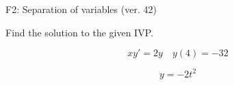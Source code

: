 \begin{exercise}
  \begin{exerciseTitle}F2: Separation of variables (ver. 42)\end{exerciseTitle}
  \begin{exerciseStatement}
    
Find the solution to the given IVP.

    
\[xy'= 2 y \hspace{1em} y( 4 ) = -32\]

  \end{exerciseStatement}
  \begin{exerciseAnswer}
    
\[y= -2 t^ 2\]

  \end{exerciseAnswer}
\end{exercise}